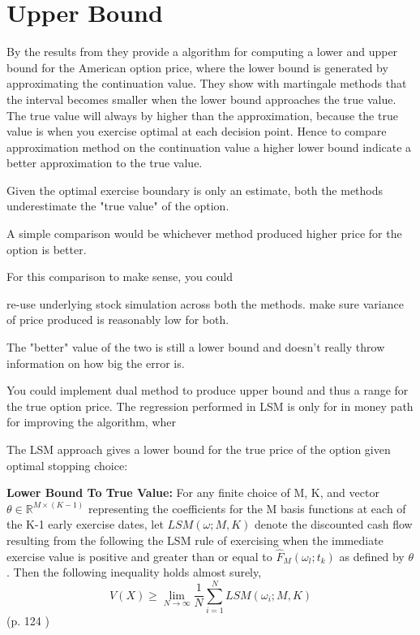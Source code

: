 \section{Upper Bound}
By the results from \parencite{AndersenLeif2004} they provide a algorithm for computing a lower and upper bound for the American option price, where the lower bound is generated by approximating the continuation value. They show with martingale methods that the interval becomes smaller when the lower bound approaches the true value. The true value will always by higher than the approximation, because the true value is when you exercise optimal at each decision point. Hence to compare approximation method on the continuation value a higher lower bound indicate a better approximation to the true value.

Given the optimal exercise boundary is only an estimate, both the methods underestimate the "true value" of the option.

A simple comparison would be whichever method produced higher price for the option is better.

For this comparison to make sense, you could

    re-use underlying stock simulation across both the methods.
    make sure variance of price produced is reasonably low for both.

The "better" value of the two is still a lower bound and doesn't really throw information on how big the error is.

You could implement dual method to produce upper bound and thus a range for the true option price.
The regression performed in LSM is only for in money path for improving the algorithm, wher



The LSM approach gives a lower bound for the true price of the option given optimal stopping choice:
\theoremstyle{proposition}
\begin{proposition}{}\label{Lower-Bound-LSM}
\textbf{Lower Bound To True Value:} For any finite choice of M, K, and vector $\theta\in \mathbb{R}^{M \times (K-1)}$ representing the coefficients for the M basis functions at each of the K-1 early exercise dates, let $LSM(\omega;M,K)$ denote the discounted cash flow resulting from the following the LSM rule of exercising when the immediate exercise value is positive and greater than or equal to $\hat{F}_{M}(\omega_{l};t_{k})$ as defined by $\theta$. Then the following inequality holds almost surely,
$$V(X)\geq \lim_{N\to \infty} \dfrac{1}{N}\sum_{i=1}^{N} LSM(\omega_i;M,K)$$
(p. 124 \parencite{LSM})
\end{proposition}

